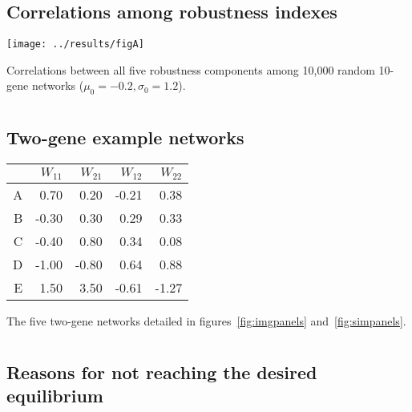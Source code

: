 \documentclass[a4paper]{article}
\begin{document}
\begin{appendices}
  \setcounter{section}{0}
  \renewcommand{\thesection}{\arabic{section}}

  \clearpage
  \section{}
    \label{supp:fullcorr}
    \subsection*{Correlations among robustness indexes}

	\texttt{[image: ../results/figA]}
	
	Correlations between all five robustness components among 10,000 random 10-gene networks ($\mu_0=-0.2, \sigma_0=1.2$). 



  \clearpage
  \section{}
    \label{supp:W}
    \subsection*{Two-gene example networks}

	\begin{center}
	\begin{tabular}{rrrrr}
	  \hline
	 & $W_{11}$ & $W_{21}$ & $W_{12}$ & $W_{22}$ \\ 
	  \hline
	  A & 0.70 & 0.20 & -0.21 & 0.38 \\ 
	  B & -0.30 & 0.30 & 0.29 & 0.33 \\ 
	  C & -0.40 & 0.80 & 0.34 & 0.08 \\ 
	  D & -1.00 & -0.80 & 0.64 & 0.88 \\ 
	  E & 1.50 & 3.50 & -0.61 & -1.27 \\ 
	   \hline
	\end{tabular}
	\end{center}
	
	The five two-gene networks detailed in figures~\ref{fig:imgpanels} and~\ref{fig:simpanels}.

  \clearpage
  \section{}
    \label{supp:whyitfails}
    \subsection*{Reasons for not reaching the desired equilibrium}


\end{appendices}
\end{document}
